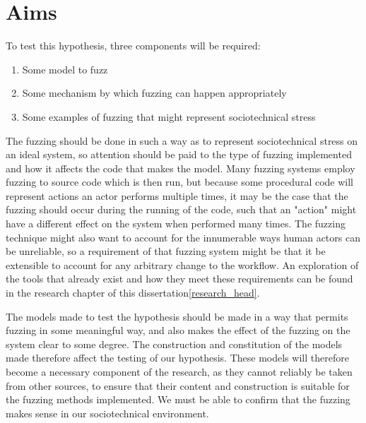 \section{Aims}
\label{aims}
To test this hypothesis, three components will be required:
\begin{enumerate}
    \item Some model to fuzz
    \item Some mechanism by which fuzzing can happen appropriately
    \item Some examples of fuzzing that might represent sociotechnical stress
\end{enumerate}\par%

The fuzzing should be done in such a way as to represent sociotechnical stress on an ideal system, so attention should be paid to the type of fuzzing implemented and how it affects the code that makes the model. Many fuzzing systems employ fuzzing to source code which is then run, but because some procedural code will represent actions an actor performs multiple times, it may be the case that the fuzzing should occur during the running of the code, such that an "action" might have a different effect on the system when performed many times. The fuzzing technique might also want to account for the innumerable ways human actors can be unreliable, so a requirement of that fuzzing system might be that it be extensible to account for any arbitrary change to the workflow. An exploration of the tools that already exist and how they meet these requirements can be found in the research chapter of this dissertation\cref{research_head}. \par%

The models made to test the hypothesis should be made in a way that permits fuzzing in some meaningful way, and also makes the effect of the fuzzing on the system clear to some degree. The construction and constitution of the models made therefore affect the testing of our hypothesis. These models will therefore become a necessary component of the research, as they cannot reliably be taken from other sources, to ensure that their content and construction is suitable for the fuzzing methods implemented. We must be able to confirm that the fuzzing makes sense in our sociotechnical environment. \par%

